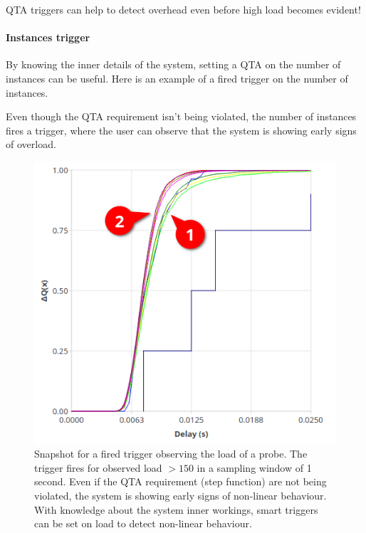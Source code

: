     QTA triggers can help to detect overhead even before high load becomes evident!

        \paragraph{Instances trigger}
        By knowing the inner details of the system, setting a QTA on the number of instances can be useful. Here is an example of a fired trigger on the number of instances.

        Even though the QTA requirement isn't being violated, the number of instances fires a trigger, where the user can observe that the system is showing early signs of overload.
        \begin{figure}[H]
            \begin{center}
                \includegraphics[scale=0.5]{img/overload_2/fired_samplea.png}
            \end{center}
            \caption{Snapshot for a fired trigger observing the load of a probe. The trigger fires for observed load $> 150$ in a sampling window of 1 second. Even if the QTA requirement (step function) are not being violated, the system is showing early signs of non-linear behaviour.
            \\
            With knowledge about the system inner workings, smart triggers can be set on load to detect non-linear behaviour.}
        \end{figure}
  
